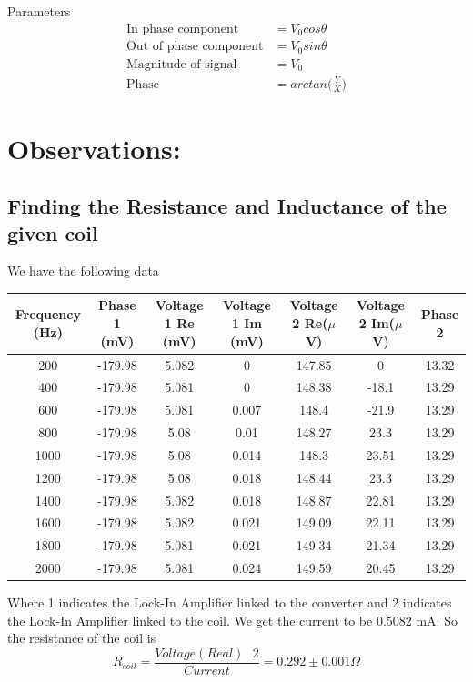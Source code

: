 \documentclass[]{report}[12 pt]
\begin{document}
Parameters
\begin{align*}
	\text{In phase component}&=V_0cos\theta \\
	\text{Out of phase component}&=V_0sin\theta \\
	\text{Magnitude of signal}&=V_0\\
	\text{Phase}&=arctan\big(\frac{Y}{X}\big)
\end{align*}
	\section*{Observations:}
\subsection*{Finding the Resistance and Inductance of the given coil}
We have the following data 
\begin{center}
	\begin{tabular}{|c|c|c|c|c|c|c|}
		\hline
		Frequency (Hz)  & Phase 1 (mV) & Voltage 1 Re (mV) & Voltage 1 Im (mV) & Voltage 2 Re($\mu$V) & Voltage 2 Im($\mu$V) & Phase 2 \\
		\hline
		200 & -179.98 & 5.082 & 0 & 147.85 & 0 & 13.32 \\
		\hline
		400 & -179.98 & 5.081 & 0 & 148.38 & -18.1 & 13.29 \\
		\hline
		600 & -179.98 & 5.081 & 0.007 & 148.4 & -21.9 & 13.29 \\
		\hline
		800 & -179.98 & 5.08 & 0.01 & 148.27 & 23.3 & 13.29 \\
		\hline
		1000 & -179.98 & 5.08 & 0.014 & 148.3 & 23.51 & 13.29 \\
		\hline
		1200 & -179.98 & 5.08 & 0.018 & 148.44 & 23.3 & 13.29 \\
		\hline
		1400 & -179.98 & 5.082 & 0.018 & 148.87 & 22.81 & 13.29 \\
		\hline
		1600 & -179.98 & 5.082 & 0.021 & 149.09 & 22.11 & 13.29 \\
		\hline
		1800 & -179.98 & 5.081 & 0.021 & 149.34 & 21.34 & 13.29 \\
		\hline
		2000 & -179.98 & 5.081 & 0.024 & 149.59 & 20.45 & 13.29 \\
		\hline
	\end{tabular}
\end{center}
Where 1 indicates the Lock-In Amplifier linked to the converter and 2 indicates the Lock-In Amplifier linked to the coil. We get the current to be 0.5082 mA.
So the resistance of the coil is 
\[R_{coil}=\frac{Voltage(Real)\text{   }2}{Current}=0.292 \pm 0.001  \Omega \]
\end{document}
